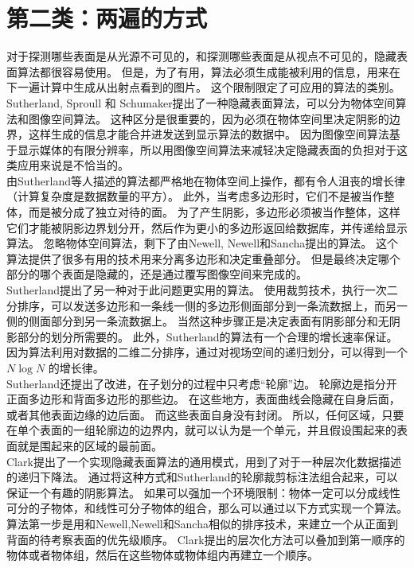 \section{第二类：两遍的方式}
对于探测哪些表面是从光源不可见的，和探测哪些表面是从视点不可见的，隐藏表面算法都很容易使用。
但是，为了有用，算法必须生成能被利用的信息，用来在下一遍计算中生成从出射点看到的图片。
这个限制限定了可应用的算法的类别。\\
Sutherland, Sproull 和 Schumaker提出了一种隐藏表面算法，可以分为物体空间算法和图像空间算法\cite{12}。
这种区分是很重要的，因为必须在物体空间里决定阴影的边界，这样生成的信息才能合并进发送到显示算法的数据中。
因为图像空间算法基于显示媒体的有限分辨率，所以用图像空间算法来减轻决定隐藏表面的负担对于这类应用来说是不恰当的。\\
由Sutherland等人描述的算法\cite{12}都严格地在物体空间上操作，都有令人沮丧的增长律（计算复杂度是数据数量的平方）。
此外，当考虑多边形时，它们不是被当作整体，而是被分成了独立对待的面。
为了产生阴影，多边形必须被当作整体，这样它们才能被阴影边界划分开，然后作为更小的多边形返回给数据库，并传递给显示算法。
忽略物体空间算法，剩下了由Newell, Newell和Sancha提出的算法\cite{9}。
这个算法提供了很多有用的技术用来分离多边形和决定重叠部分。
但是最终决定哪个部分的哪个表面是隐藏的，还是通过覆写图像空间来完成的。\\
Sutherland提出了另一种对于此问题更实用的算法\cite{11}。
使用裁剪技术，执行一次二分排序，可以发送多边形和一条线一侧的多边形侧面部分到一条流数据上，而另一侧的侧面部分到另一条流数据上。
当然这种步骤正是决定表面有阴影部分和无阴影部分的划分所需要的。
此外，Sutherland的算法有一个合理的增长速率保证。
因为算法利用对数据的二维二分排序，通过对视场空间的递归划分，可以得到一个$ N\log N $ 的增长律。\\
Sutherland还提出了改进，在子划分的过程中只考虑“轮廓”边。
轮廓边是指分开正面多边形和背面多边形的那些边。
在这些地方，表面曲线会隐藏在自身后面，或者其他表面边缘的边后面。
而这些表面自身没有封闭\cite{1}。
所以，任何区域，只要在单个表面的一组轮廓边的边界内，就可以认为是一个单元，并且假设围起来的表面就是围起来的区域的最前面。\\
Clark提出了一个实现隐藏表面算法的通用模式，用到了对于一种层次化数据描述的递归下降法\cite{7}。
通过将这种方式和Sutherland的轮廓裁剪标注法组合起来，可以保证一个有趣的阴影算法。
如果可以强加一个环境限制：物体一定可以分成线性可分的子物体，和线性可分子物体的组合，那么可以通过以下方式实现一个算法。\\
算法第一步是用和Newell,Newell和Sancha相似的排序技术，来建立一个从正面到背面的待考察表面的优先级顺序。
Clark提出的层次化方法可以叠加到第一顺序的物体或者物体组，然后在这些物体或物体组内再建立一个顺序。
